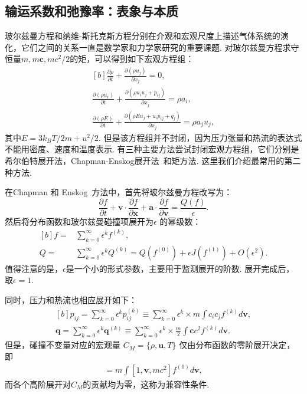 \subsection{输运系数和弛豫率：表象与本质}

玻尔兹曼方程和纳维-斯托克斯方程分别在介观和宏观尺度上描述气体系统的演化，它们之间的关系一直是数学家和力学家研究的重要课题\cite{Sone2002Book}.  对玻尔兹曼方程求守恒量$m, m\bm{c},mc^2/2$的矩，可以得到如下宏观方程组：
\begin{equation}\label{macro}
\begin{aligned}[b]
\frac{\partial \rho}{\partial t}+\frac{\partial(\rho{}u_j) }{\partial x_j}=0, \\
\frac{\partial (\rho{u_i})}{\partial t}+\frac{\partial (\rho{}u_iu_j+p_{ij})}{\partial x_j}= \rho{}a_i,\\
\frac{\partial \left(\rho{}E\right)}{\partial t}+\frac{\partial \left(\rho{}{E}u_j+u_i{p}_{ij}+q_j\right)}{\partial x_j}=\rho{}a_ju_j,
\end{aligned}
\end{equation} 
其中$E=3k_BT/2m+u^2/{2}$. 但是该方程组并不封闭，因为压力张量和热流的表达式不能用密度、速度和温度表示.  有三种主要方法尝试封闭宏观方程组，它们分别是希尔伯特展开法\cite{Hilbert1912}，Chapman-Enskog展开法~\cite{Chapman1916,enskog1917,CE}和矩方法\cite{Grad1949,henning}. 这里我们介绍最常用的第二种方法. 

在Chapman 和 Enskog~\cite{Chapman1916,enskog1917}方法中，首先将玻尔兹曼方程改写为：
\begin{equation}\label{expansion0}
\frac{\partial f}{\partial t}+\bm{v}\cdot\frac{\partial f}{\partial
	\bm{x}}+\bm{a}\cdot\frac{\partial f}{\partial \bm{v}}=\frac{Q(f)}{\epsilon}.
\end{equation} 
然后将分布函数和玻尔兹曼碰撞项展开为$\epsilon$ 的幂级数：
\begin{equation}\label{expansion1}
\begin{aligned}[b]
f=&\sum_{k=0}^\infty {\epsilon^k} f^{(k)},\\
Q=&\sum_{k=0}^\infty {\epsilon^k} Q^{(k)}=Q(f^{(0)})
+\epsilon{}{J}(f^{(1)})+O(\epsilon^2).
\end{aligned}
\end{equation}
值得注意的是，$\epsilon$是一个小的形式参数，主要用于监测展开的阶数. 展开完成后，取$\epsilon=1$. 

同时，压力和热流也相应展开如下：
\begin{equation}\label{shere_hilbert}
\begin{aligned}[b]
p_{ij} =\sum_{k=0}^\infty {\epsilon^k} p_{ij}^{(k)}
\equiv \sum_{k=0}^\infty {\epsilon^k} \times{}m\int{}c_ic_jf^{(k)}d\bm{v},
\\  
\bm{q} =\sum_{k=0}^\infty {\epsilon^k} \bm{q}^{(k)}
\equiv \sum_{k=0}^\infty {\epsilon^k} \times{}\frac{m}{2}\int{}\bm{c}c^2f^{(k)}d\bm{v}. 
\end{aligned}
\end{equation}
但是，碰撞不变量对应的宏观量 $C_M=\{\rho,\bm{u}, T\}$ 仅由分布函数的零阶展开决定，即
\begin{eqnarray}
[\rho,\rho\bm{u}, 3k_B\rho{}T]=m\int{}[1,\bm{v},mc^2]f^{(0)}d\bm{v}, \label{density_hilbert}
\end{eqnarray}
而各个高阶展开对$C_M$的贡献均为零，这称为兼容性条件. 


